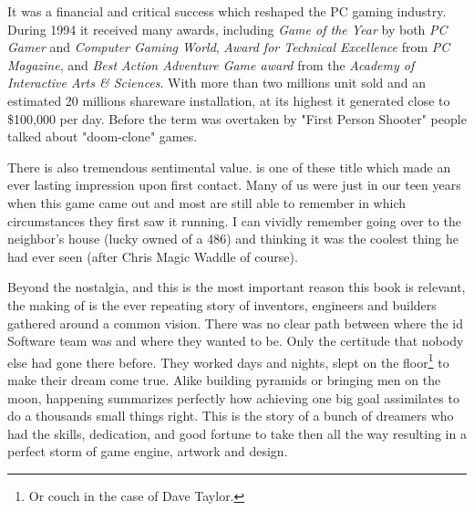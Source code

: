 It was a financial and critical success which reshaped the PC gaming industry. During 1994 it received many awards, including \textit{Game of the Year} by both \textit{PC Gamer} and \textit{Computer Gaming World}, \textit{Award for Technical Excellence} from \textit{PC Magazine}, and \textit{Best Action Adventure Game award} from the \textit{Academy of Interactive Arts \& Sciences}. With more than two millions unit sold and an estimated 20 millions shareware installation, at its highest it generated close to \$100,000 per day. Before the term was overtaken by "First Person Shooter" people talked about "doom-clone" games.\\
 \par
 \par
There is also tremendous sentimental value. \doom is one of these title which made an ever lasting impression upon first contact. Many of us were just in our teen years when this game came out and most are still able to remember in which circumstances they first saw it running. I can vividly remember going over to the neighbor's house (lucky owned of a 486) and thinking it was the coolest thing he had ever seen (after Chris Magic Waddle of course).\\
\par


Beyond the nostalgia, and this is the most important reason this book is relevant, the making of \doom is the ever repeating story of inventors, engineers and builders gathered around a common vision. There was no clear path between where the id Software team was and where they wanted to be. Only the certitude that nobody else had gone there before. They worked days and nights, slept on the floor\footnote{Or couch in the case of Dave Taylor.} to make their dream come true. Alike building pyramids or bringing men on the moon, \doom happening summarizes perfectly how achieving one big goal assimilates to do a thousands small things right. This is the story of a bunch of dreamers who had the skills, dedication, and good fortune to take then all the way resulting in a perfect storm of game engine, artwork and design.\\
\par



